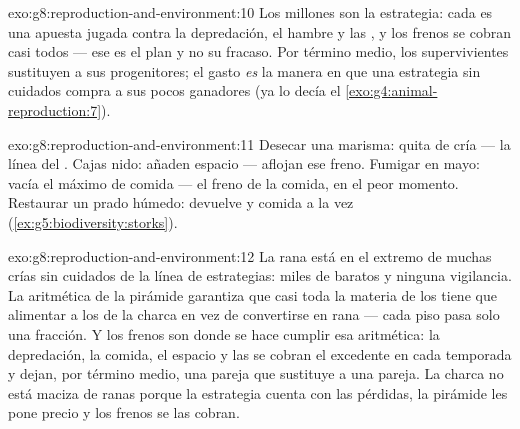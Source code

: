 \begin{solution}{exo:g8:reproduction-and-environment:10}
Los millones son la estrategia: cada  es una apuesta jugada contra
la depredación, el hambre y las , y los frenos se cobran
casi todos --- ese es el plan y no su fracaso. Por término medio, los
supervivientes sustituyen a sus progenitores; el gasto \emph{es} la
manera en que una estrategia sin cuidados compra a sus pocos ganadores
(ya lo decía el \cref{exo:g4:animal-reproduction:7}).
\end{solution}

\begin{solution}{exo:g8:reproduction-and-environment:11}
Desecar una marisma: quita  de cría --- la línea del .
Cajas nido: añaden espacio --- aflojan ese freno. Fumigar en mayo:
vacía el máximo de comida --- el freno de la comida, en el peor
momento. Restaurar un prado húmedo: devuelve  y comida a la vez
(\cref{ex:g5:biodiversity:storks}).
\end{solution}

\begin{solution}{exo:g8:reproduction-and-environment:12}
La rana está en el extremo de muchas crías sin cuidados de la línea de
estrategias: miles de  baratos y ninguna vigilancia. La
aritmética de la pirámide garantiza que casi toda la materia de los
 tiene que alimentar a los  de la charca en vez
de convertirse en rana --- cada piso pasa solo una fracción. Y los
frenos son donde se hace cumplir esa aritmética: la depredación, la
comida, el espacio y las  se cobran el excedente en cada
temporada y dejan, por término medio, una pareja que sustituye a una
pareja. La charca no está maciza de ranas porque la estrategia cuenta
con las pérdidas, la pirámide les pone precio y los frenos se las
cobran.
\end{solution}


